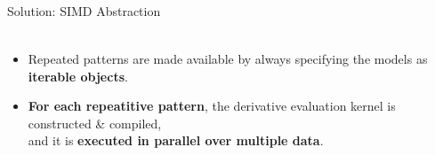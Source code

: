 \begin{frame}{Solution: SIMD Abstraction}
\begin{itemize}
{\begin{align*}
      \end{align*}
    }
    \vspace{-.1in} 
  \item<3-> Repeated patterns are made available by always specifying the models as {\bf iterable objects}.
    \begin{center}
    \end{center} 
  \item<4-> {\bf For each repeatitive pattern}, the derivative evaluation kernel is constructed \& compiled,\\ and it is {\bf executed in parallel over multiple data}.
  \end{itemize}
\end{frame}

